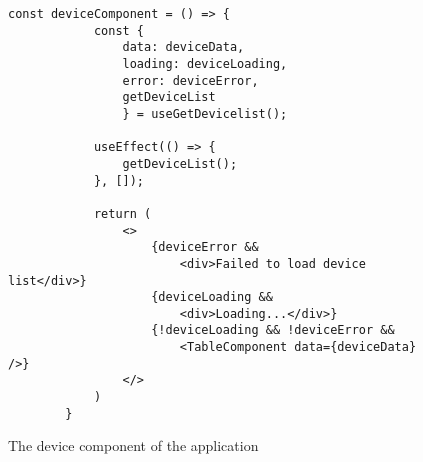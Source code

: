 \begin{figure}[htbp]
    \begin{lstlisting}[language=React]
        const deviceComponent = () => {
            const {
                data: deviceData, 
                loading: deviceLoading, 
                error: deviceError,
                getDeviceList
                } = useGetDevicelist();
            
            useEffect(() => {
                getDeviceList();
            }, []);

            return (
                <>
                    {deviceError && 
                        <div>Failed to load device list</div>}
                    {deviceLoading && 
                        <div>Loading...</div>}
                    {!deviceLoading && !deviceError && 
                        <TableComponent data={deviceData} />}
                </>
            )
        }
    \end{lstlisting}
    \caption{The device component of the application}
    \label{fig:deviceComponent}
\end{figure}